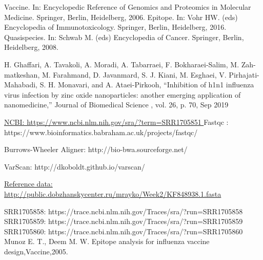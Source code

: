 \documentclass{article}
\begin{document}
 
\newpage
\begin{thebibliography}{9}

% 
%

Vaccine. In: Encyclopedic Reference of Genomics and Proteomics in Molecular Medicine. Springer, Berlin, Heidelberg, 2006. 
Epitope. In: Vohr HW. (eds) Encyclopedia of Immunotoxicology. Springer, Berlin, Heidelberg, 2016.
 Quasispecies. In: Schwab M. (eds) Encyclopedia of Cancer. Springer, Berlin, Heidelberg, 2008. 

H. Ghaffari, A. Tavakoli, A. Moradi, A. Tabarraei, F. Bokharaei-Salim, M. Zah-
matkeshan, M. Farahmand, D. Javanmard, S. J. Kiani, M. Esghaei, V. Pirhajati-
Mahabadi, S. H. Monavari, and A. Ataei-Pirkooh, “Inhibition of h1n1 influenza
virus  infection  by  zinc  oxide  nanoparticles:   another  emerging  application  of
nanomedicine,”
Journal of Biomedical Science
, vol. 26, p. 70, Sep 2019
 
\href{ https://www.ncbi.nlm.nih.gov/sra/?term=SRR1705851}{NCBI: https://www.ncbi.nlm.nih.gov/sra/?term=SRR1705851 }
 Fastqc : https://www.bioinformatics.babraham.ac.uk/projects/fastqc/
 
 
Burrows-Wheeler Aligner:  http://bio-bwa.sourceforge.net/ 

VarScan: http://dkoboldt.github.io/varscan/
 
\href{http://public.dobzhanskycenter.ru/mrayko/Week2/KF848938.1.fasta}{Reference data: http://public.dobzhanskycenter.ru/mrayko/Week2/KF848938.1.fasta}
 
SRR1705858: https://trace.ncbi.nlm.nih.gov/Traces/sra/?run=SRR1705858 \\
SRR1705859: https://trace.ncbi.nlm.nih.gov/Traces/sra/?run=SRR1705859 \\
SRR1705860: https://trace.ncbi.nlm.nih.gov/Traces/sra/?run=SRR1705860 \\
  
Munoz E. T., Deem M. W. Epitope analysis for influenza vaccine design,Vaccine,2005.

\end{thebibliography}
\end{document}
